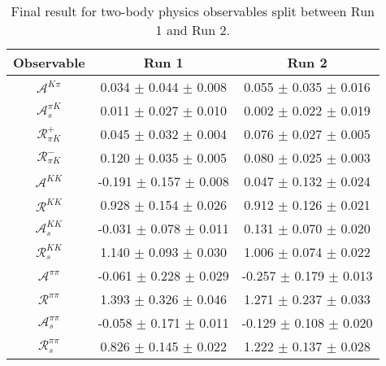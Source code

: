 \begin{table}
\centering
\begin{tabular}{ccc}
Observable & Run 1 & Run 2\\
\midrule
$\mathcal{A}^{K\pi}$ & 0.034 $\pm$ 0.044 $\pm$ 0.008 & 0.055 $\pm$ 0.035 $\pm$ 0.016 \\
$\mathcal{A}_s^{\pi K}$ & 0.011 $\pm$ 0.027 $\pm$ 0.010 & 0.002 $\pm$ 0.022 $\pm$ 0.019 \\
$\mathcal{R}_{\pi K}^+$ & 0.045 $\pm$ 0.032 $\pm$ 0.004 & 0.076 $\pm$ 0.027 $\pm$ 0.005 \\
$\mathcal{R}_{\pi K}^-$ & 0.120 $\pm$ 0.035 $\pm$ 0.005 & 0.080 $\pm$ 0.025 $\pm$ 0.003 \\
$\mathcal{A}^{KK}$ & -0.191 $\pm$ 0.157 $\pm$ 0.008 & 0.047 $\pm$ 0.132 $\pm$ 0.024 \\
$\mathcal{R}^{KK}$ & 0.928 $\pm$ 0.154 $\pm$ 0.026 & 0.912 $\pm$ 0.126 $\pm$ 0.021 \\
$\mathcal{A}_s^{KK}$ & -0.031 $\pm$ 0.078 $\pm$ 0.011 & 0.131 $\pm$ 0.070 $\pm$ 0.020 \\
$\mathcal{R}_{s}^{KK}$ & 1.140 $\pm$ 0.093 $\pm$ 0.030 & 1.006 $\pm$ 0.074 $\pm$ 0.022 \\
$\mathcal{A}^{\pi\pi}$ & -0.061 $\pm$ 0.228 $\pm$ 0.029 & -0.257 $\pm$ 0.179 $\pm$ 0.013 \\
$\mathcal{R}^{\pi\pi}$ & 1.393 $\pm$ 0.326 $\pm$ 0.046 & 1.271 $\pm$ 0.237 $\pm$ 0.033 \\
$\mathcal{A}_s^{\pi\pi}$ & -0.058 $\pm$ 0.171 $\pm$ 0.011 & -0.129 $\pm$ 0.108 $\pm$ 0.020 \\
$\mathcal{R}_{s}^{\pi\pi}$ & 0.826 $\pm$ 0.145 $\pm$ 0.022 & 1.222 $\pm$ 0.137 $\pm$ 0.028 \\
\end{tabular}
\caption{Final result for two-body physics observables split between Run 1 and Run 2.}
\label{tab:results_splitObs_twoBody}
\end{table}
